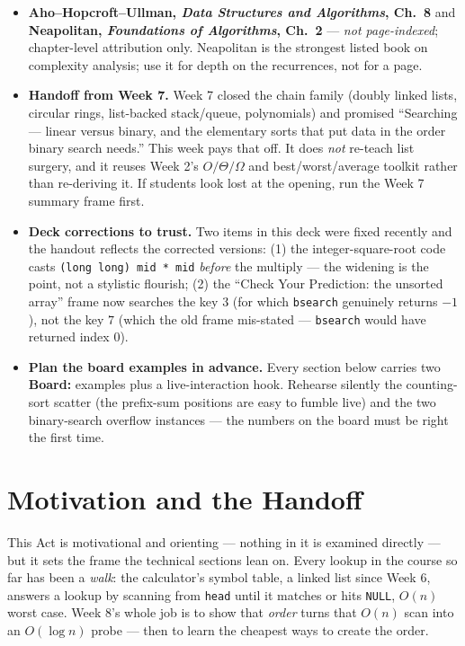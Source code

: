 \documentclass[11pt]{article}
\begin{document}
\begin{itemize}
  \item \textbf{Aho--Hopcroft--Ullman, \textit{Data Structures and Algorithms}, Ch.~8} and \textbf{Neapolitan, \textit{Foundations of Algorithms}, Ch.~2} --- \emph{not page-indexed}; chapter-level attribution only. Neapolitan is the strongest listed book on complexity analysis; use it for depth on the recurrences, not for a page.
  \item \textbf{Handoff from Week 7.} Week 7 closed the chain family (doubly linked lists, circular rings, list-backed stack/queue, polynomials) and promised ``Searching --- linear versus binary, and the elementary sorts that put data in the order binary search needs.'' This week pays that off. It does \emph{not} re-teach list surgery, and it reuses Week 2's $O/\Theta/\Omega$ and best/worst/average toolkit rather than re-deriving it. If students look lost at the opening, run the Week 7 summary frame first.
  \item \textbf{Deck corrections to trust.} Two items in this deck were fixed recently and the handout reflects the corrected versions: (1) the integer-square-root code casts \texttt{(long long) mid * mid} \emph{before} the multiply --- the widening is the point, not a stylistic flourish; (2) the ``Check Your Prediction: the unsorted array'' frame now searches the key $3$ (for which \texttt{bsearch} genuinely returns $-1$), not the key $7$ (which the old frame mis-stated --- \texttt{bsearch} would have returned index $0$).
  \item \textbf{Plan the board examples in advance.} Every section below carries two \textbf{Board:} examples plus a live-interaction hook. Rehearse silently the counting-sort scatter (the prefix-sum positions are easy to fumble live) and the two binary-search overflow instances --- the numbers on the board must be right the first time.
\end{itemize}
\endgroup

\section{Motivation and the Handoff}

This Act is motivational and orienting --- nothing in it is examined directly --- but it sets the frame the technical sections lean on. Every lookup in the course so far has been a \emph{walk}: the calculator's symbol table, a linked list since Week 6, answers a lookup by scanning from \texttt{head} until it matches or hits \texttt{NULL}, $O(n)$ worst case. Week 8's whole job is to show that \emph{order} turns that $O(n)$ scan into an $O(\log n)$ probe --- then to learn the cheapest ways to create the order.
\end{document}
